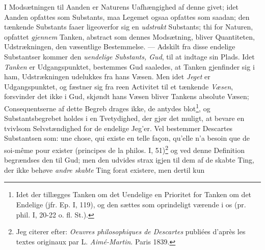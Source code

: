 \documentclass[12pt,a4paper]{book}
\newcommand{\opage}[1]{\marginnote{\footnotesize\textit{[#1]}}}
\begin{document}
I Modsætningen til Aanden er Naturens Uafhængighed af denne givet; idet
Aanden opfattes som Substants, maa Legemet ogsaa opfattes som saadan; den
tænkende Substants faaer ligeoverfor sig en \emph{udstrakt} Substants;
thi for Naturen, opfattet \emph{gjennem} Tanken, abstract som dennes
Modsætning, bliver Quantiteten, Udstrækningen, den væsentlige
Bestemmelse. --- Adskilt fra disse endelige Substantser kommer den
\emph{uendelige Substants, Gud}, til at indtage sin Plads. Idet
\emph{Tanken} er Udgangspunktet, bestemmes Gud saaledes, at Tanken
gjenfinder sig i ham, Udstrækningen udelukkes fra hans Væsen. Men idet
\emph{Jeget} er Udgangspunktet, og fæstner sig fra reen Activitet til et
tænkende \emph{Væsen}, forsvinder det ikke i Gud, skjøndt hans Væsen
\opage{20} \setcounter{footnote}{0}%
bliver Tankens absolute Væsen; Consequentserne af dette Begreb drages
ikke, de antydes blot\footnote{Idet der tillægges Tanken om det Uendelige
en Prioritet for Tanken om det Endelige (jfr. Ep. I, 119), og den sættes
som oprindeligt værende i os (pr. phil. I, 20-22 o. fl. St.).}, og
Substantsbegrebet holdes i en Tvetydighed, der gjør det muligt, at bevare
en tvivlsom Selvstændighed for de endelige Jeg'er. Vel bestemmer
Descartes Substantsen som: une chose, qui existe en telle façon, qu'elle
n'a besoin que de soi-même pour exister (principes de la philos. I,
51)\footnote{Jeg citerer efter: \emph{Oeuvres philosophiques de
Descartes} publiées d'après les textes originaux par
L. \emph{Aimé-Martin}. Paris 1839.} og ved denne Definition begrændses
den til Gud; men den udvides strax igjen til dem af de skabte Ting, der
ikke behøve \emph{andre skabte} Ting forat existere, men dertil kun
\end{document}
